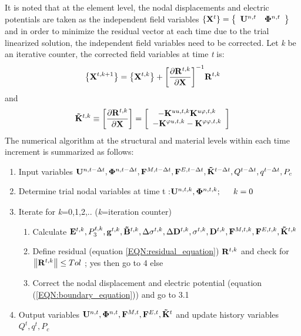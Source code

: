 It is noted that at the element level, the nodal displacements and electric potentials are taken as the independent field variables $\left\{ {{{\bf{X}}^t}} \right\} = \left\{ {\begin{array}{*{20}{c}} {{{\bf{U}}^{n,t}}}&{{{\bf{\Phi }}^{n,t}}} \end{array}} \right\}$ and in order to minimize the residual vector at each time due to the trial linearized solution, the independent field variables need to be corrected. 
Let \textit{k} be an iterative counter, the corrected field variables at time \textit{t} is:
\begin{equation}  
\left\{ {{{\bf{X}}^{t,k + 1}}} \right\} = \left\{ {{{\bf{X}}^{t,k}}} \right\} + {\left[ {\frac{{\partial {\bf{R}}_{}^{t,k}}}{{\partial {\bf{X}}}}} \right]^{ - 1}}{\bf{R}}_{}^{t,k}
\label{EQN:newton_raphson} 
\end{equation}
and
\begin{equation}  
{{\bf{\tilde K}}^{t,k}} \equiv \left[ {\frac{{\partial {\bf{R}}_{}^{t,k}}}{{\partial {\bf{X}}}}} \right] = \left[ {\begin{array}{*{20}{c}}
{ - {\bf{K}}_{}^{uu,t,k}{\rm{       }}{\bf{K}}_{}^{u\varphi ,t,k}}\\
{ - {\bf{K}}_{}^{\varphi u,t,k}{\rm{    }} - {\bf{K}}_{}^{\varphi \varphi ,t,k}}
\end{array}} \right]
\label{EQN:newton_raphson_then}
\end{equation}
The numerical algorithm at the structural and material levels within each time increment is summarized as follows:
\begin{enumerate}
  \item Input variables ${{\bf{U}}^{n,t - \Delta t}},{{\bf{\Phi }}^{n,t - \Delta t}},{{\bf{F}}^{M,t - \Delta t}},{{\bf{F}}^{E,t - \Delta t}},{{\bf{\tilde K}}^{t - \Delta t}},{Q^{t - \Delta t}},{q^{t - \Delta t}},{P_c}$
  \item Determine trial nodal variables at time t :${{\bf{U}}^{n,t,k}},{{\bf{\Phi }}^{n,t,k}};\begin{array}{*{20}{c}} {}&{k = 0} \end{array}$
  \item Iterate for \textit{k}=0,1,2,.. (\textit{k}=iteration counter)
  \begin{enumerate}
    \item Calculate ${\bf{E}}_{}^{t,k},P_3^{t,k},{{\bf{g}}^{t,k}},{{\bf{\tilde B}}^{t,k}},\Delta {{\bf{\sigma }}^{t,k}},\Delta {{\bf{D}}^{t,k}},{{\bf{\sigma }}^{t,k}},{{\bf{D}}^{t,k}},{{\bf{F}}^{M,t,k}},{{\bf{F}}^{E,t,k}},{{\bf{\tilde K}}^{t,k}}$
    \item Define residual (equation \ref{EQN:residual_equation}) ${{\bf{R}}^{t,k}}$ and check for $\left\| {{\bf{R}}_{}^{t,k}} \right\| \le Tol$ ; yes then go to 4 else  
    \item Correct the nodal displacement and electric potential (equation (\ref{EQN:boundary_equation}))  and go to 3.1
  \end{enumerate}
 \item Output variables ${{\bf{U}}^{n,t}},{{\bf{\Phi }}^{n,t}},
 {{\bf{F}}^{M,t}},{{\bf{F}}^{E,t}},{{\bf{\tilde K}}^t}$ and update history variables ${Q^t},{q^t},{P_c}$
\end{enumerate}  

